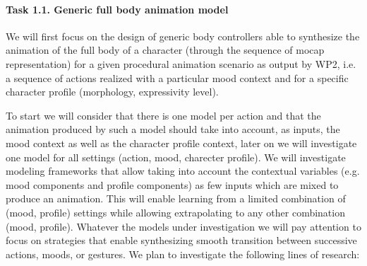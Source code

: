 \paragraph{Task 1.1. Generic full body animation model}

We will first focus on the design of generic body controllers able to synthesize the animation of the full body of a character (through the sequence of mocap representation) for a given procedural animation scenario as output by WP2, i.e. a sequence of actions realized with a particular mood context and for a specific character profile (morphology, expressivity level). 

To start we will consider that there is one model per action and that the animation produced by such a model should take into account, as inputs, the mood context as well as the character profile context, later on we will investigate one model for all settings (action, mood, charecter profile). We will investigate modeling frameworks that allow taking into account the contextual variables (e.g. mood components and profile components) as few inputs which are mixed to produce an animation. This will enable learning from a limited combination of (mood, profile) settings while allowing extrapolating to any other combination (mood, profile). 
Whatever the models under investigation we will pay attention to focus on strategies that enable synthesizing smooth transition between successive actions, moods, or gestures. 
We plan to investigate the following lines of research:
 
